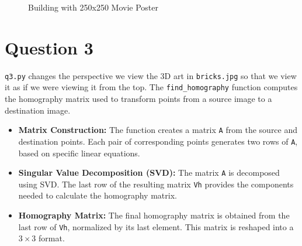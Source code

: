 \documentclass{article}
\newif\ifblackandwhitecycle
\gdef\patternnumber{0}
\gdef\patternnumber{1}
\gdef\patternnumber{1}
\gdef\patternnumber{0}
\gdef\columncount{1}
\gdef\rowcount{1}
\newcommand\zoombox[2][]{
    \begin{scope}[zoombox paths]
        \pgfmathsetmacro\xpos{
            (\columncount-1)*(\imagewidth / \pgfkeysvalueof{/tikz/zoomboxarray columns} + \pgfkeysvalueof{/tikz/zoomboxarray inner gap} / \pgfkeysvalueof{/tikz/zoomboxarray columns} ) + \pgflinewidth
        }
        \pgfmathsetmacro\ypos{
            (\rowcount-1)*( \imageheight / \pgfkeysvalueof{/tikz/zoomboxarray rows} + \pgfkeysvalueof{/tikz/zoomboxarray inner gap} / \pgfkeysvalueof{/tikz/zoomboxarray rows} ) + 0.5*\pgflinewidth
        }
        \edef\dospy{\noexpand\spy [
            #1,
            zoombox paths/.append style={
                black and white pattern=\patternnumber
            },
            every spy on node/.append style={#1},
            x=\imagewidth,
            y=\imageheight
        ] on (#2) in node [anchor=north west] at ($(zoomboxes container.north west)+(\xpos pt,-\ypos pt)$);}
        \dospy
        \pgfmathtruncatemacro\pgfmathresult{ifthenelse(\columncount==\pgfkeysvalueof{/tikz/zoomboxarray columns},\rowcount+1,\rowcount)}
        \global\let\rowcount=\pgfmathresult
        \pgfmathtruncatemacro\pgfmathresult{ifthenelse(\columncount==\pgfkeysvalueof{/tikz/zoomboxarray columns},1,\columncount+1)}
        \global\let\columncount=\pgfmathresult
        \ifblackandwhitecycle
            \pgfmathtruncatemacro{\newpatternnumber}{\patternnumber+1}
            \global\edef\patternnumber{\newpatternnumber}
        \fi
    \end{scope}
}
\begin{document}
\begin{figure}[H]\centering
    \caption{Building with 250x250 Movie Poster}
    \end{figure}
    

\section{Question 3}
\texttt{q3.py} changes the perspective we view the 3D art in \texttt{bricks.jpg} so that we view it as if we were viewing it from the top.
The \texttt{find\_homography} function computes the homography matrix used to transform points from a source image to a destination image.

\begin{itemize}
    \item \textbf{Matrix Construction:} The function creates a matrix \texttt{A} from the source and destination points. Each pair of corresponding points generates two rows of \texttt{A}, based on specific linear equations.
    \item \textbf{Singular Value Decomposition (SVD):} The matrix \texttt{A} is decomposed using SVD. The last row of the resulting matrix \texttt{Vh} provides the components needed to calculate the homography matrix.
    \item \textbf{Homography Matrix:} The final homography matrix is obtained from the last row of \texttt{Vh}, normalized by its last element. This matrix is reshaped into a $3 \times 3$ format.
\end{itemize}
\end{document}
